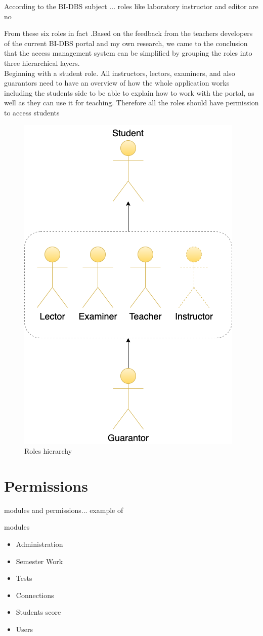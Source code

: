 
According to the BI-DBS subject ... roles like laboratory instructor and editor are no

\noindent From these six roles in fact .Based on the feedback from the teachers developers of the current BI-DBS portal and my own research, we came to the conclusion that the access management system can be simplified by grouping the roles into three hierarchical layers.\\

Beginning with a student role. All instructors, lectors, examiners, and also guarantors need to have an overview of how the whole application works including the students side to be able to explain how to work with the portal, as well as they can use it for teaching. Therefore all the roles should have permission to access students 



\begin{figure}[h]
\centering
\includegraphics[scale=0.57]{../png/role.png}
\caption{Roles hierarchy}\label{picture:roles}
\end{figure}


\section{Permissions} modules and permissions... example of 

modules
\begin{itemize}
    \item Administration
    \item Semester Work
    \item Tests
    \item Connections
    \item Students score
    \item Users
\end{itemize}